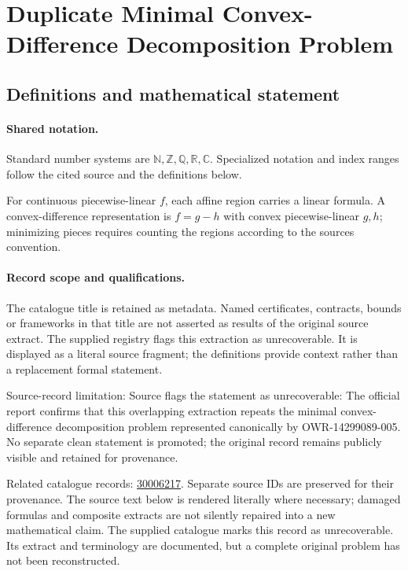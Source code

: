 \documentclass[11pt]{article}
\begin{document}
\section{Duplicate Minimal Convex-Difference Decomposition Problem}\label{statement}

\subsection{Definitions and mathematical statement}

\paragraph{Shared notation.}Standard number systems are $\mathbb N,\mathbb Z,\mathbb Q,\mathbb R,\mathbb C$. Specialized notation and index ranges follow the cited source and the definitions below.


For continuous piecewise-linear $f$, each affine region carries a linear formula. A convex-difference representation is $f=g-h$ with convex piecewise-linear $g,h$; minimizing pieces requires counting the regions according to the source\textquotesingle s convention.
\paragraph{Record scope and qualifications.}
The catalogue title is retained as metadata. Named certificates, contracts, bounds or frameworks in that title are not asserted as results of the original source extract.
The supplied registry flags this extraction as unrecoverable. It is displayed as a literal source fragment; the definitions provide context rather than a replacement formal statement.

Source-record limitation: Source flags the statement as unrecoverable: The official report confirms that this overlapping extraction repeats the minimal convex-difference decomposition problem represented canonically by OWR-14299089-005. No separate clean statement is promoted; the original record remains publicly visible and retained for provenance.

Related catalogue records: \href{https://mehmetmars7.github.io/Erdosproblems-llm-hunter/problem.html?type=open_problems&id=30006217}{30006217}. Separate source IDs are preserved for their provenance.
The source text below is rendered literally where necessary; damaged formulas and composite extracts are not silently repaired into a new mathematical claim.
The supplied catalogue marks this record as unrecoverable. Its extract and terminology are documented, but a complete original problem has not been reconstructed.
\end{document}
